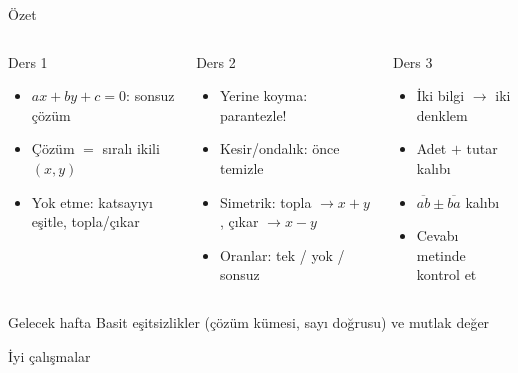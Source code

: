 \documentclass[aspectratio=169,11pt]{beamer}
\newcommand{\ab}[1]{\overline{#1}}
\begin{document}
\begin{frame}{Özet}
\begin{columns}[t]
\begin{block}{Ders 1}
\begin{itemize}
\item \(ax+by+c=0\): sonsuz çözüm
\item Çözüm \(=\) sıralı ikili \((x,y)\)
\item Yok etme: katsayıyı eşitle, topla/çıkar
\end{itemize}
\end{block}
\begin{block}{Ders 2}
\begin{itemize}
\item Yerine koyma: parantezle!
\item Kesir/ondalık: önce temizle
\item Simetrik: topla \(\to x+y\), çıkar \(\to x-y\)
\item Oranlar: tek / yok / sonsuz
\end{itemize}
\end{block}
\begin{block}{Ders 3}
\begin{itemize}
\item İki bilgi \(\to\) iki denklem
\item Adet \(+\) tutar kalıbı
\item \(\ab{ab}\pm\ab{ba}\) kalıbı
\item Cevabı metinde kontrol et
\end{itemize}
\end{block}
\end{columns}
\vspace{6pt}
\begin{alertblock}{Gelecek hafta}
Basit eşitsizlikler (çözüm kümesi, sayı doğrusu) ve mutlak değer
\end{alertblock}
\end{frame}

\begin{frame}
\centering\Large İyi çalışmalar
\end{frame}
\end{document}
